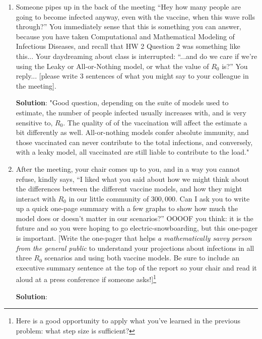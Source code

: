 \documentclass[11pt]{article}
\begin{document}
\begin{enumerate}
\begin{enumerate}[label=\alph*.]
\begin{tcolorbox}
	\end{tcolorbox}
	\item Someone pipes up in the back of the meeting ``Hey how many people are going to become infected anyway, even with the vaccine, when this wave rolls through?'' You immediately sense that this is something you can answer, because you have taken Computational and Mathematical Modeling of Infectious Diseases, and recall that HW 2 Question 2 was something like this... Your daydreaming about class is interrupted: ``...and do we care if we're using the Leaky or All-or-Nothing model, or what the value of $R_0$ is?'' You reply... [please write 3 sentences of what you might say to your colleague in the meeting].
	\begin{tcolorbox}
		\textbf{Solution}: 
		"Good question, depending on the suite of models used to estimate, the number of people infected usually increases with, and is very sensitive to, $R_0$. The quality of of the vaccination will affect the estimate a bit differently as well. All-or-nothing models confer absolute immunity, and those vaccinated can never contribute to the total infections, and conversely, with a leaky model, all vaccinated are still liable to contribute to the load."
	\end{tcolorbox}
	\item After the meeting, your chair comes up to you, and in a way you cannot refuse, kindly says, ``I liked what you said about how we might think about the differences between the different vaccine models, and how they might interact with $R_0$ in our little community of $300,000$. Can I ask you to write up a quick one-page summary with a few graphs to show how much the model does or doesn't matter in our scenarios?''  OOOOF you think: it is the future and so you were hoping to go electric-snowboarding, but this one-pager is important. [Write the one-pager that helps {\it a mathematically savvy person from the general public} to understand your projections about infections in all three $R_0$ scenarios and using both vaccine models. Be sure to include an executive summary sentence at the top of the report so your chair and read it aloud at a press conference if someone asks!]\footnote{Here is a good opportunity to apply what you've learned in the previous problem: what step size is sufficient?}
	\begin{tcolorbox}
		\textbf{Solution}:
	\end{tcolorbox}
\end{enumerate}


\end{enumerate}
\end{document}
